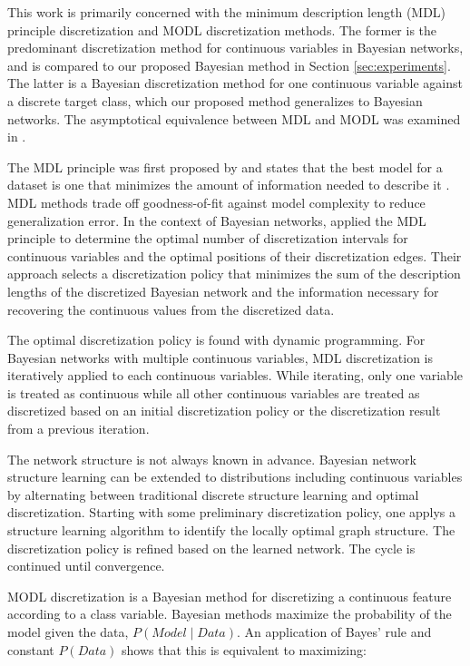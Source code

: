 This work is primarily concerned with the minimum description length (MDL) principle discretization \citep{Friedman_1996} and MODL discretization \citep{Boulle_2006} methods.
The former is the predominant discretization method for continuous variables in Bayesian networks, and is compared to our proposed Bayesian method in Section \ref{sec:experiments}.
The latter is a Bayesian discretization method for one continuous variable against a discrete target class, which our proposed method generalizes to Bayesian networks.
The asymptotical equivalence between MDL and MODL was examined in \citep{VL_2000}.

The MDL principle was first proposed by \cite{MDL_1978} and states that the best model for a dataset is one that minimizes the amount of information needed to describe it \citep{Grunwald_2009}.
MDL methods trade off goodness-of-fit against model complexity to reduce generalization error.
In the context of Bayesian networks, \cite{Friedman_1996} applied the MDL principle to determine the optimal number of discretization intervals for continuous variables and the optimal positions of their discretization edges.
Their approach selects a discretization policy that minimizes the sum of the description lengths of the discretized Bayesian network and the information necessary for recovering the continuous values from the discretized data.

The optimal discretization policy is found with dynamic programming.
For Bayesian networks with multiple continuous variables, MDL discretization is iteratively applied to each continuous variables.
While iterating, only one variable is treated as continuous while all other continuous variables are treated as discretized based on an initial discretization policy or the discretization result from a previous iteration.

The network structure is not always known in advance.
Bayesian network structure learning can be extended to distributions including continuous variables by alternating between traditional discrete structure learning and optimal discretization.
Starting with some preliminary discretization policy, one applys a structure learning algorithm to identify the locally optimal graph structure.
The discretization policy is refined based on the learned network.
The cycle is continued until convergence.

MODL discretization \citep{Boulle_2006} is a Bayesian method for discretizing a continuous feature according to a class variable.
Bayesian methods maximize the probability of the model given the data, $P(\textit{Model} \mid \textit{Data})$.
An application of Bayes' rule and constant $P(\textit{Data})$ shows that this is equivalent to maximizing:


